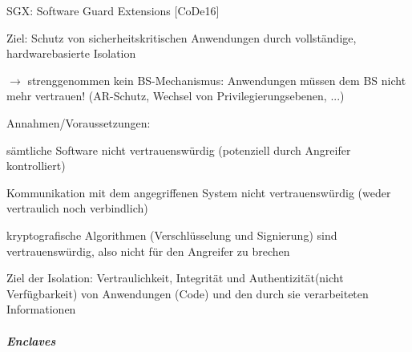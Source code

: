 \documentclass[a4paper]{article}
\begin{document}
\begin{multicols}{3}
    \begin{itemize*}
        \item
        SGX: Software Guard Extensions {[}CoDe16{]}
        \item
        Ziel: Schutz von sicherheitskritischen Anwendungen durch vollständige,
        hardwarebasierte Isolation
        \item
        $\rightarrow$ strenggenommen kein BS-Mechanismus:
        Anwendungen müssen dem BS nicht mehr vertrauen! (AR-Schutz, Wechsel
        von Privilegierungsebenen, ...)
        \item
        Annahmen/Voraussetzungen:
        \begin{enumerate*}

            \item sämtliche Software nicht vertrauenswürdig (potenziell durch Angreifer kontrolliert)
            \item Kommunikation mit dem angegriffenen System nicht vertrauenswürdig (weder vertraulich noch verbindlich)
            \item kryptografische Algorithmen (Verschlüsselung und Signierung) sind vertrauenswürdig, also nicht für den Angreifer zu brechen
            \item Ziel der Isolation: Vertraulichkeit, Integrität und Authentizität(nicht Verfügbarkeit) von Anwendungen (Code) und den durch sie verarbeiteten Informationen
        \end{enumerate*}
    \end{itemize*}


    \subparagraph{Enclaves}


\end{multicols}
\end{document}
